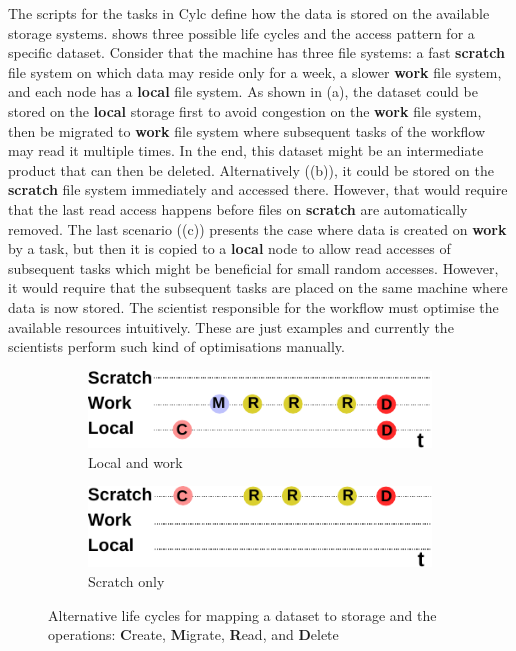 \documentclass[a4paper]{article}
\begin{document}
The scripts for the tasks in Cylc define how the data is stored on the available storage systems.
 shows three possible life cycles and the access pattern for a specific dataset.
Consider that the machine has three file systems: a fast \textbf{scratch} file system on which data may reside only for a week, a slower \textbf{work} file system, and each node has a \textbf{local} file system.
As shown in (a), the dataset could be stored on the \textbf{local} storage first to avoid congestion on the \textbf{work} file system, then be migrated to \textbf{work} file system where subsequent tasks of the workflow may read it multiple times.
In the end, this dataset might be an intermediate product that can then be deleted.
Alternatively ((b)), it could be stored on the \textbf{scratch} file system immediately and accessed there.
However, that would require that the last read access happens before files on \textbf{scratch} are automatically removed.
The last scenario ((c)) presents the case where data is created on \textbf{work} by a task, but then it is copied to a \textbf{local} node to allow read accesses of subsequent tasks which might be beneficial for small random accesses.
However, it would require that the subsequent tasks are placed on the same machine where data is now stored.
The scientist responsible for the workflow must optimise the available resources intuitively.
These are just examples and currently the scientists perform such kind of optimisations manually.


\begin{figure}[tb]
  \centering
  \begin{subfigure}{.45\textwidth}
  \includegraphics[width=0.9\columnwidth]{lifecycle-1}
  \caption{Local and work}
  \end{subfigure}
  \begin{subfigure}{.45\textwidth}
  \includegraphics[width=0.9\columnwidth]{lifecycle-2}
  \caption{Scratch only}
  \end{subfigure}


  \caption{Alternative life cycles for mapping a dataset to storage and the operations: \textbf{C}reate, \textbf{M}igrate, \textbf{R}ead, and \textbf{D}elete}
  \label{fig:lifecycle}
\end{figure}
\end{document}

